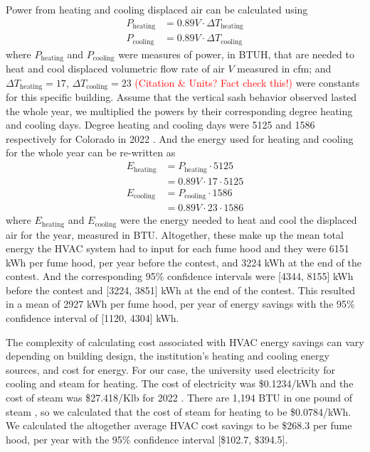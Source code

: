 \documentclass[12pt, twocolumn]{article}
\begin{document}
Power from heating and cooling displaced air can be calculated using
\begin{equation}\label{Eq:PowerHeatingCooling}
\begin{aligned}
	P_{\text{heating}} &= 0.89 V \cdot \Delta T_{\text{heating}} \\
	P_{\text{cooling}} &= 0.89 V \cdot \Delta T_{\text{cooling}}
\end{aligned}
\end{equation}
where $P_{\text{heating}}$ and $P_{\text{cooling}}$ were measures of power, in BTUH, that are needed to heat and cool displaced volumetric flow rate of air $V$ measured in cfm; and $\Delta T_{\text{heating}} = 17$, $\Delta T_{\text{cooling}} = 23$ \textcolor{red}{(Citation \& Units? Fact check this!)} were constants for this specific building. Assume that the vertical sash behavior observed lasted the whole year, we multiplied the powers by their corresponding degree heating and cooling days. Degree heating and cooling days were 5125 and 1586 respectively for Colorado in 2022 \cite{CoolingHeating2024}. And the energy used for heating and cooling for the whole year can be re-written as
\begin{equation}\label{Eq:EnergyHeatingCooling}
\begin{aligned}
	E_{\text{heating}} &= P_{\text{heating}} \cdot 5125\\ &= 0.89 V \cdot 17 \cdot 5125\\
	E_{\text{cooling}} &= P_{\text{cooling}} \cdot 1586\\ &= 0.89 V \cdot 23 \cdot 1586
\end{aligned}
\end{equation}
where $E_{\text{heating}}$ and $E_{\text{cooling}}$ were the energy needed to heat and cool the displaced air for the year, measured in BTU. Altogether, these make up the mean total energy the HVAC system had to input for each fume hood and they were 6151 kWh per fume hood, per year before the contest, and 3224 kWh at the end of the contest. And the corresponding 95\% confidence intervals were [4344, 8155] kWh before the contest and [3224, 3851] kWh at the end of the contest. This resulted in a mean of 2927 kWh per fume hood, per year of energy savings with the 95\% confidence interval of [1120, 4304] kWh. 

The complexity of calculating cost associated with HVAC energy savings can vary depending on building design, the institution's heating and cooling energy sources, and cost for energy. For our case, the university used electricity for cooling and steam for heating. The cost of electricity was \$0.1234/kWh and the cost of steam was \$27.418/Klb for 2022 \cite{EnergyCost}. There are 1,194 BTU in one pound of steam \cite{ThermalConversion}, so we calculated that the cost of steam for heating to be \$0.0784/kWh. We calculated the altogether average HVAC cost savings to be \$268.3 per fume hood, per year with the 95\% confidence interval [\$102.7, \$394.5]. 
\end{document}
